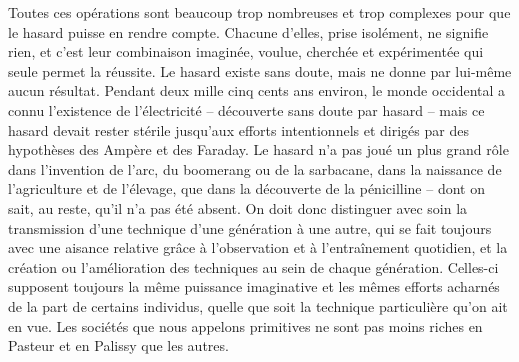 \documentclass[french,twoside]{book} %
\begin{document}
Toutes ces opérations sont beaucoup trop nombreuses et trop complexes pour que le hasard puisse en rendre compte. Chacune d’elles, prise isolément, ne signifie rien, et c’est leur combinaison imaginée, voulue, cherchée et expérimentée qui seule permet la réussite. Le hasard existe sans doute, mais ne donne par lui-même aucun résultat. Pendant deux mille cinq cents ans environ, le monde occidental a connu l’existence de l’électricité – découverte sans doute par hasard – mais ce hasard devait rester stérile jusqu’aux efforts intentionnels et dirigés par des hypothèses des Ampère et des Faraday. Le hasard n’a pas joué un plus grand rôle dans l’invention de l’arc, du boomerang ou de la sarbacane, dans la naissance de l’agriculture et de l’élevage, que dans la découverte de la pénicilline – dont on sait, au reste, qu’il n’a pas été absent. On doit donc distinguer avec soin la transmission d’une technique d’une génération à une autre, qui se fait toujours avec une aisance relative grâce à l’observation et à l’entraînement quotidien, et la création ou l’amélioration des techniques au sein de chaque génération. Celles-ci supposent toujours la même puissance imaginative et les mêmes efforts acharnés de la part de certains individus, quelle que soit la technique particulière qu’on ait en vue. Les sociétés que nous appelons primitives ne sont pas moins riches en Pasteur et en Palissy que les autres.\par
\end{document}
